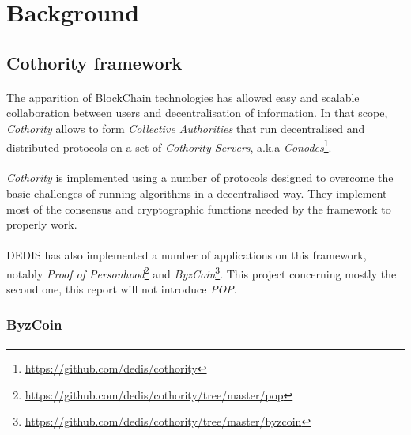\section{Background}

\subsection{Cothority framework}

\paragraph{}

The apparition of BlockChain technologies has allowed easy and scalable collaboration between users and decentralisation of information. In that scope, \textit{Cothority} allows to form \textit{Collective Authorities} that run decentralised and distributed protocols on a set of \textit{Cothority Servers}, a.k.a \textit{Conodes}\footnote{\url{https://github.com/dedis/cothority}}.

\paragraph{}

\textit{Cothority} is implemented using a number of protocols designed to overcome the basic challenges of running algorithms in a decentralised way. They implement most of the consensus and cryptographic functions needed by the framework to properly work.

\paragraph{}

DEDIS has also implemented a number of applications on this framework, notably \textit{Proof of Personhood}\footnote{\url{https://github.com/dedis/cothority/tree/master/pop}} and \textit{ByzCoin}\footnote{\url{https://github.com/dedis/cothority/tree/master/byzcoin}}. This project concerning mostly the second one, this report will not introduce \textit{POP}.

\subsubsection{ByzCoin}

\paragraph{}

